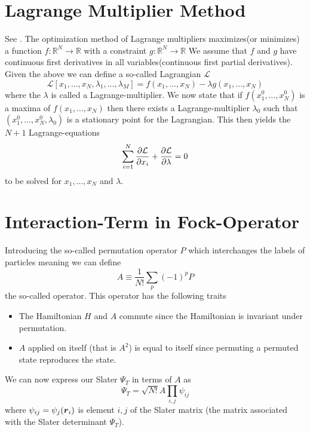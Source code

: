 \section{Lagrange Multiplier Method\label{sec:lagrange_multipliers}}
    See \cite{calcVar,calcVarSpring}. The optimization method of Lagrange
    multipliers maximizes(or minimizes) a function
    $f:\mathbb{R}^N\rightarrow\mathbb{R}$ with a constraint
    $g:\mathbb{R}^N\rightarrow\mathbb{R}$ We assume that $f$ and $g$ have
    continuous first derivatives in all variables(continuous first partial
    derivatives). \\
    Given the above we can define a so-called Lagrangian
    $\mathcal{L}$
        \begin{equation}
            \mathcal{L}[x_1,\dots,x_N,\lambda_1,\dots,\lambda_M] =
            f(x_1,\dots,x_N) - \lambda g(x_1,\dots,x_N)
            \label{eq:lagrangian}
        \end{equation}
    where the $\lambda$ is called a Lagrange-multiplier. We now state that if
    $f(x^0_1,\dots,x^0_N)$ is a maxima of $f(x_1,\dots,x_N)$ then there exists
    a Lagrange-multiplier $\lambda_0$ such that
    $(x^0_1,\dots,x^0_N,\lambda_0)$ is a stationary point
    for the Lagrangian. This then yields the $N+1$ Lagrange-equations
        \begin{align}
            \sum^N_{i=1} \frac{\mathrm{\partial}\mathcal{L}}{\mathrm{\partial} x_i} +
            \frac{\mathrm{\partial}\mathcal{L}}{\mathrm{\partial} \lambda} = 0
            \label{eq:lagrangeEQ}
        \end{align}
    to be solved for $x_1,\dots,x_N$ and $\lambda$.

\section{Interaction-Term in Fock-Operator}
        Introducing the so-called permutation operator $P$ which interchanges
        the labels of particles meaning we can define
            \begin{equation}
                A \equiv \frac{1}{N!}\sum_p(-1)^pP
            \end{equation}
        the so-called  operator. This operator has
        the following traits
            \begin{itemize}
                \item The Hamiltonian $H$ and $A$ commute since the Hamiltonian
                    is invariant under permutation.
                \item $A$ applied on itself (that is $A^2$) is equal to itself
                    since permuting a permuted state reproduces the state.
            \end{itemize}
        We can now express our Slater $\Psi_T$ in terms of $A$ as
            \begin{equation}
                \Psi_T = \sqrt{N!}A\prod_{i,j}\psi_{ij}
            \end{equation}
        where $\psi_{ij}=\psi_j(\boldsymbol{{r}}_i)$ is element $i,j$ of the Slater
        matrix (the matrix associated with the Slater determinant $\Psi_T$).

